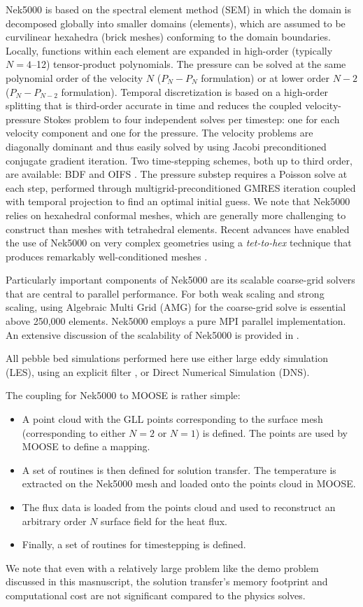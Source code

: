Nek5000 is based on the spectral element method (SEM) \cite{patera1984} in which  the domain is decomposed 
globally into smaller domains (elements), which are assumed to be curvilinear hexahedra (brick meshes) 
conforming to the domain boundaries. Locally, functions within each element are expanded in high-order
(typically $N=4$--12) tensor-product polynomials.
The pressure can be solved at the same polynomial order of the velocity $N$ ($P_{N} - P_{N}$ formulation)
or at lower order $N-2$ ($P_{N} - P_{N-2}$ formulation). 
Temporal discretization is based on a high-order splitting that is third-order
accurate in time and reduces the coupled velocity-pressure Stokes problem to
four independent solves per timestep: one for each velocity component and one
for the pressure. The velocity problems are diagonally dominant and thus easily
solved by using Jacobi preconditioned conjugate gradient iteration. Two
time-stepping schemes, both up to third order, are available: BDF and OIFS
\cite{fischer2003implementation}. The pressure substep requires a Poisson solve
at each step, performed through multigrid-preconditioned GMRES iteration
coupled with temporal projection to find an optimal initial guess.
We note that Nek5000 relies on hexahedral conformal meshes, which are generally
more challenging to construct than meshes with tetrahedral elements.  Recent
advances have enabled the use of Nek5000 on very complex geometries using a
\textit{tet-to-hex} technique that produces remarkably well-conditioned
meshes \cite{yuan2020spectral}.


Particularly important components of Nek5000 are its scalable coarse-grid solvers that are central to
parallel performance. For both weak scaling and strong scaling, using Algebraic Multi Grid (AMG) for the
coarse-grid solve is essential above 250,000 elements. Nek5000 employs a pure MPI parallel implementation.
An extensive discussion of the scalability of Nek5000 is provided in \cite{fischer15,fischer20a}.

All pebble bed simulations performed here use either large eddy simulation (LES), using an explicit 
filter \cite{fischer2001filter}, or Direct Numerical Simulation (DNS).

The coupling for Nek5000 to MOOSE is rather simple:
\begin{itemize}
\item A point cloud with the GLL points corresponding to the surface mesh (corresponding to either $N = 2$ or $N = 1$) is defined. The points are used by MOOSE to define a mapping.
\item A set of routines is then defined for solution transfer. The temperature is extracted on the Nek5000 mesh and loaded onto the points cloud in MOOSE.
\item The flux data is loaded from the points cloud and used to reconstruct an arbitrary order $N$ surface field for the heat
flux.
\item Finally, a set of routines for timestepping is defined.
\end{itemize}
We note that even with a relatively large problem like the demo problem
discussed in this masnuscript, the solution transfer's memory footprint and
computational cost are not significant compared to the physics solves.


